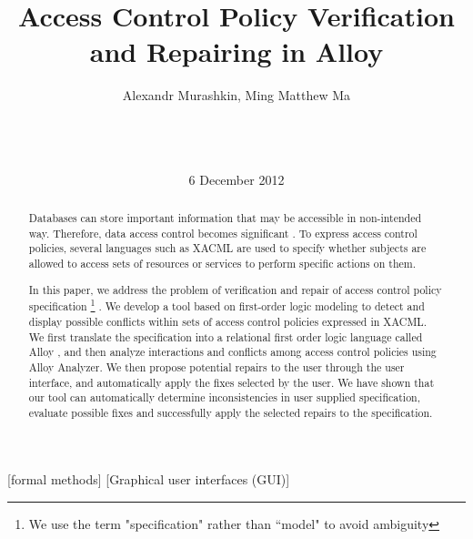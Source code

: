 \documentclass{acm_proc_article-sp}
\begin{document}
\title{Access Control Policy Verification and Repairing in Alloy}


\author{
\alignauthor Alexandr Murashkin, Ming Matthew Ma \\
       \\
       \\
       \\
}
\date{6 December 2012}
\maketitle

\begin{abstract}

Databases can store important information that may be accessible in non-intended way. Therefore, data access control becomes significant \cite{Fisler:2005:VCA:1062455.1062502}. To express access control policies, several languages such as XACML \cite{oasis:xacml} are used to specify whether subjects are allowed to access sets of resources or services to perform specific actions on them. 

In this paper, we address the problem of verification and repair of access control policy specification \footnote[1]{We use the term "specification" rather than ``model" to avoid ambiguity} . We develop a tool based on first-order logic modeling to detect and display possible conflicts within sets of access control policies expressed in XACML. We first translate the specification into a relational first order logic language called Alloy \cite{jackson:alloy}, and then analyze interactions and conflicts among access control policies using Alloy Analyzer. We then propose potential repairs to the user through the user interface, and automatically apply the fixes selected by the user. We have shown that our tool can automatically determine inconsistencies in user supplied specification, evaluate possible fixes and successfully apply the selected repairs to the specification. 

\end{abstract}

[formal methods]
[Graphical user interfaces (GUI)]
\end{document}

